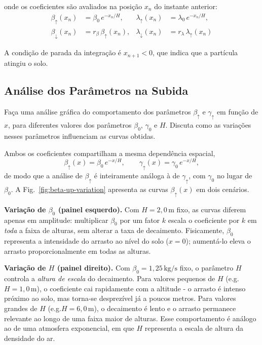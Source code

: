 onde os coeficientes são avaliados na posição $x_n$ do instante anterior:
\begin{align}
    \beta_\uparrow(x_n)   &= \beta_0\,e^{-x_n/H},             &
    \lambda_\uparrow(x_n) &= \lambda_0\,e^{-x_n/H},           \label{eq:coef-up}\\
    \beta_\downarrow(x_n)  &= r_\beta\,\beta_\uparrow(x_n),    &
    \lambda_\downarrow(x_n)&= r_\lambda\,\lambda_\uparrow(x_n) \label{eq:coef-down}
\end{align}

A condição de parada da integração é $x_{n+1} < 0$, que indica que a partícula atingiu o solo.

\subsection{Análise dos Parâmetros na Subida}

\begin{questao}
Faça uma análise gráfica do comportamento dos parâmetros $\beta_\uparrow$ e $\gamma_\uparrow$ em função de $x$, para diferentes
valores dos parâmetros $\beta_0$, $\gamma_0$ e $H$. Discuta como as variações nesses parâmetros influenciam as curvas obtidas.
\end{questao}

Ambos os coeficientes compartilham a mesma dependência espacial,
\begin{equation}
    \beta_\uparrow(x) = \beta_0\,e^{-x/H}, \qquad \gamma_\uparrow(x) = \gamma_0\,e^{-x/H},
\end{equation}
de modo que a análise de $\beta_\uparrow$ é inteiramente análoga à de $\gamma_\uparrow$, com $\gamma_0$ no lugar de $\beta_0$. A Fig.~\ref{fig:beta-up-variation} apresenta as curvas $\beta_\uparrow(x)$ em dois cenários.

\textbf{Variação de $\beta_0$ (painel esquerdo).}  Com $H = 2{,}0\,\text{m}$ fixo, as curvas diferem apenas em amplitude: multiplicar $\beta_0$ por um fator $k$ escala o coeficiente por $k$ em \emph{toda} a faixa de alturas, sem alterar a taxa de decaimento. Fisicamente, $\beta_0$ representa a intensidade do arrasto ao nível do solo ($x = 0$); aumentá-lo eleva o arrasto proporcionalmente em todas as alturas.

\textbf{Variação de $H$ (painel direito).} Com $\beta_0 = 1{,}25\,\text{kg/s}$ fixo, o parâmetro $H$ controla a \emph{altura de escala} do decaimento. Para valores pequenos de $H$ (e.g.\@ $H = 1{,}0\,\text{m}$), o coeficiente cai rapidamente com a altitude - o arrasto é intenso próximo ao solo, mas torna-se desprezível já a poucos metros. Para valores grandes de $H$ (e.g.\@ $H = 6{,}0\,\text{m}$), o decaimento é lento e o arrasto permanece relevante ao longo de uma faixa maior de alturas. Esse comportamento é análogo ao de uma atmosfera exponencial, em que $H$ representa a escala de altura da densidade do ar.

